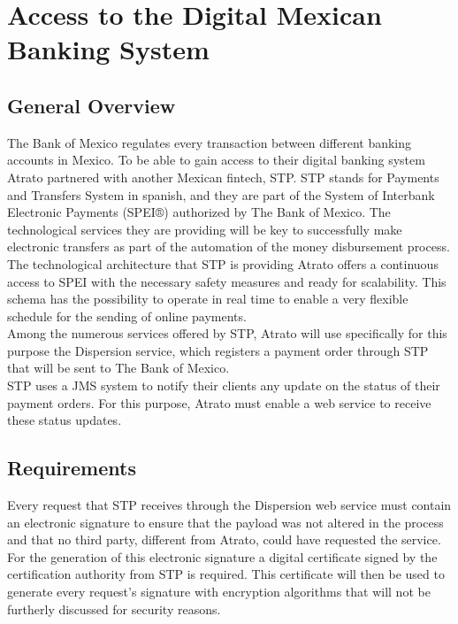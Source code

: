 \chapter{Access to the Digital Mexican Banking System}

\section{General Overview}

The Bank of Mexico regulates every transaction between different banking accounts in Mexico. To be able to gain access to their digital banking system Atrato partnered with another Mexican fintech, STP. STP stands for Payments and Transfers System in spanish, and they are part of the System of Interbank Electronic Payments (SPEI®) authorized by The Bank of Mexico. The technological services they are providing will be key to successfully make electronic transfers as part of the automation of the money disbursement process. \cite{spei}\\

The technological architecture that STP is providing Atrato offers a continuous access to SPEI with the necessary safety measures and ready for scalability. This schema has the possibility to operate in real time to enable a very flexible schedule for the sending of online payments.\\

Among the numerous services offered by STP, Atrato will use specifically for this purpose the Dispersion service, which registers a payment order through STP that will be sent to The Bank of Mexico.\\

STP uses a JMS system to notify their clients any update on the status of their payment orders. For this purpose, Atrato must enable a web service to receive these status updates.

\section{Requirements}

Every request that STP receives through the Dispersion web service must contain an electronic signature to ensure that the payload was not altered in the process and that no third party, different from Atrato, could have requested the service.\\

For the generation of this electronic signature a digital certificate signed by the certification authority from STP is required. This certificate will then be used to generate every request’s signature with encryption algorithms that will not be furtherly discussed for security reasons.\\

